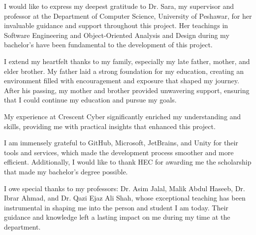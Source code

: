 {}
I would like to express my deepest gratitude to Dr. Sara, my supervisor and professor at the Department of Computer Science, University of Peshawar, for her invaluable guidance and support throughout this project. Her teachings in Software Engineering and Object-Oriented Analysis and Design during my bachelor's have been fundamental to the development of this project.

I extend my heartfelt thanks to my family, especially my late father, mother, and elder brother. My father laid a strong foundation for my education, creating an environment filled with encouragement and exposure that shaped my journey. After his passing, my mother and brother provided unwavering support, ensuring that I could continue my education and pursue my goals.

My experience at Crescent Cyber significantly enriched my understanding and skills, providing me with practical insights that enhanced this project.

I am immensely grateful to GitHub, Microsoft, JetBrains, and Unity for their tools and services, which made the development process smoother and more efficient. Additionally, I would like to thank HEC for awarding me the scholarship that made my bachelor's degree possible.

I owe special thanks to my professors: Dr. Asim Jalal, Malik Abdul Haseeb, Dr. Ibrar Ahmad, and Dr. Qazi Ejaz Ali Shah, whose exceptional teaching has been instrumental in shaping me into the person and student I am today. Their guidance and knowledge left a lasting impact on me during my time at the department.
